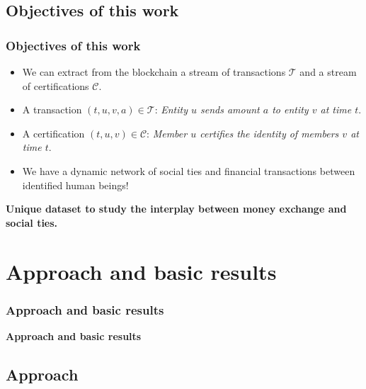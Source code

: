 \documentclass{beamer}
\begin{document}
\subsection{Objectives of this work}


\begin{frame}
\frametitle{Objectives of this work}

\begin{itemize}
\item We can extract from the blockchain a stream of transactions $\mathcal{T}$ and a stream of certifications $\mathcal{C}$.
\item A transaction $\left(t,u,v,a\right) \in \mathcal{T}$: \textit{Entity $u$ sends amount $a$ to entity $v$ at time $t$}.
\item A certification $\left(t,u,v\right) \in \mathcal{C}$: \textit{Member $u$ certifies the identity of members $v$ at time $t$}.
\item We have a dynamic network of social ties and financial transactions between identified human beings!
\end{itemize}

\medskip

\textbf{Unique dataset to study the interplay between money exchange and social ties.}

\end{frame}

\section{Approach and basic results}

\begin{frame}
\frametitle{Approach and basic results}

\begin{center}
{\huge \textbf{Approach and basic results}}
\end{center}

\end{frame}

\subsection{Approach}

\end{document}
